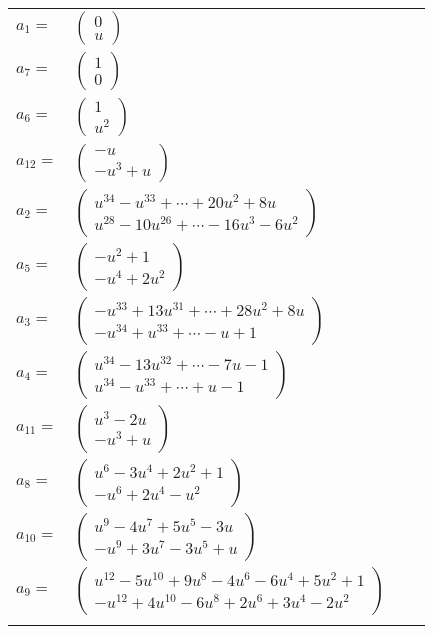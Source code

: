 \documentclass[1p]{elsarticle_modified}
\theoremstyle{definition}
\begin{document}
\begin{tabular}{m{7pt} m{180pt} m{7pt} m{180pt} }
\flushright $a_{1}=$&$\begin{pmatrix}0\\u\end{pmatrix}$ \\
\flushright $a_{7}=$&$\begin{pmatrix}1\\0\end{pmatrix}$ \\
\flushright $a_{6}=$&$\begin{pmatrix}1\\u^2\end{pmatrix}$ \\
\flushright $a_{12}=$&$\begin{pmatrix}- u\\- u^3+u\end{pmatrix}$ \\
\flushright $a_{2}=$&$\begin{pmatrix}u^{34}- u^{33}+\cdots+20 u^2+8 u\\u^{28}-10 u^{26}+\cdots-16 u^3-6 u^2\end{pmatrix}$ \\
\flushright $a_{5}=$&$\begin{pmatrix}- u^2+1\\- u^4+2 u^2\end{pmatrix}$ \\
\flushright $a_{3}=$&$\begin{pmatrix}- u^{33}+13 u^{31}+\cdots+28 u^2+8 u\\- u^{34}+u^{33}+\cdots- u+1\end{pmatrix}$ \\
\flushright $a_{4}=$&$\begin{pmatrix}u^{34}-13 u^{32}+\cdots-7 u-1\\u^{34}- u^{33}+\cdots+u-1\end{pmatrix}$ \\
\flushright $a_{11}=$&$\begin{pmatrix}u^3-2 u\\- u^3+u\end{pmatrix}$ \\
\flushright $a_{8}=$&$\begin{pmatrix}u^6-3 u^4+2 u^2+1\\- u^6+2 u^4- u^2\end{pmatrix}$ \\
\flushright $a_{10}=$&$\begin{pmatrix}u^9-4 u^7+5 u^5-3 u\\- u^9+3 u^7-3 u^5+u\end{pmatrix}$ \\
\flushright $a_{9}=$&$\begin{pmatrix}u^{12}-5 u^{10}+9 u^8-4 u^6-6 u^4+5 u^2+1\\- u^{12}+4 u^{10}-6 u^8+2 u^6+3 u^4-2 u^2\end{pmatrix}$\\&\end{tabular}
\end{document}
